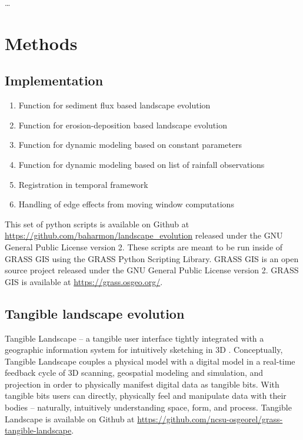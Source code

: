 \documentclass[final,3p,times,twocolumn]{elsarticle}
\begin{document}
\ldots
\cite{mitasova2013}





\section{Methods}

\subsection{Implementation}

\begin{enumerate}
\item Function for sediment flux based landscape evolution
\item Function for erosion-deposition based landscape evolution
\item Function for dynamic modeling based on constant parameters
\item Function for dynamic modeling based on list of rainfall observations
\item Registration in temporal framework
\item Handling of edge effects from moving window computations
\end{enumerate}

This set of python scripts is available on Github at \url{https://github.com/baharmon/landscape_evolution} released under the GNU General Public License version 2. These scripts are meant to be run inside of GRASS GIS using the GRASS Python Scripting Library. GRASS GIS is an open source project released under the GNU General Public License version 2. GRASS GIS is available at \url{https://grass.osgeo.org/}. 

\subsection{Tangible landscape evolution}

Tangible Landscape -- a tangible user interface tightly integrated with a geographic information system for intuitively sketching in 3D \cite{petrasova2015}. Conceptually, Tangible Landscape couples a physical model with a digital model in a real-time feedback cycle of 3D scanning, geospatial modeling and simulation, and projection in order to physically manifest digital data as tangible bits. With tangible bits users can directly, physically feel and manipulate data with their bodies -- naturally, intuitively understanding space, form, and process. Tangible Landscape is available on Github at \url{https://github.com/ncsu-osgeorel/grass-tangible-landscape}.
\end{document}
